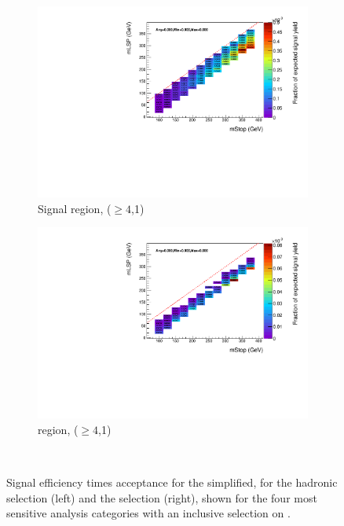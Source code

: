 \begin{figure}[ht!]
\begin{subfigure}[b]{0.47\textwidth}
    \includegraphics[width=\textwidth]{Figs/sms/t2degen/v23/effs/T2_4body_had_eff_maps_eq1b_ge4j_SITV.pdf}
    \caption{Signal region, ($\geq 4$,1)}
    \label{fig:t2_4body_sig_eff_ge4j_1b}
  \end{subfigure}
  \begin{subfigure}[b]{0.47\textwidth}
    \includegraphics[width=\textwidth]{Figs/sms/t2degen/v23/effs/T2_4body_muon_eff_maps_eq1b_ge4j_SITV.pdf}
    \caption{\mj region, ($\geq 4$,1)}
    \label{fig:t2_4body_mu_eff_ge4j_1b}
  \end{subfigure} \\
  \caption{Signal efficiency times acceptance for the \Ttwodegen simplified, for 
  the hadronic selection (left) and the \mj selection (right), shown for the 
  four most sensitive analysis categories with an inclusive selection on \HT.}
  \label{fig:t2_4body_eff}
\end{figure}

